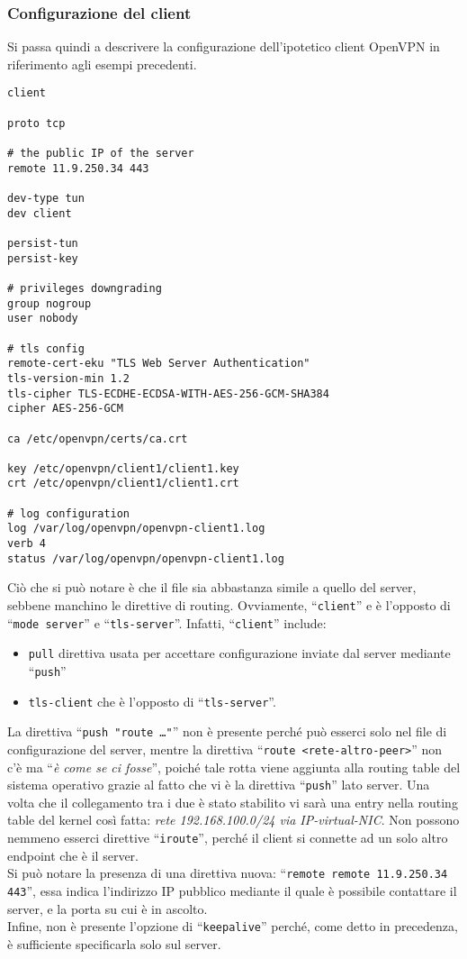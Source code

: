 \subsubsection{Configurazione del client}
Si passa quindi a descrivere la configurazione dell'ipotetico client OpenVPN in
riferimento agli esempi precedenti.
\begin{verbatim}
client

proto tcp

# the public IP of the server
remote 11.9.250.34 443

dev-type tun
dev client

persist-tun
persist-key

# privileges downgrading
group nogroup
user nobody

# tls config
remote-cert-eku "TLS Web Server Authentication"
tls-version-min 1.2
tls-cipher TLS-ECDHE-ECDSA-WITH-AES-256-GCM-SHA384
cipher AES-256-GCM

ca /etc/openvpn/certs/ca.crt

key /etc/openvpn/client1/client1.key
crt /etc/openvpn/client1/client1.crt

# log configuration
log /var/log/openvpn/openvpn-client1.log
verb 4
status /var/log/openvpn/openvpn-client1.log
\end{verbatim}
Ciò che si può notare è che il file sia abbastanza simile a quello del server,
sebbene manchino le direttive di routing. Ovviamente, ``\texttt{client}'' e
è l'opposto di ``\texttt{mode server}'' e
``\texttt{tls-server}''. Infatti, ``\texttt{client}'' include:
\begin{itemize}
  \item \texttt{pull} direttiva usata per accettare configurazione inviate dal
  server mediante ``\texttt{push}''
  \item \texttt{tls-client} che è l'opposto di ``\texttt{tls-server}''.
\end{itemize}
La direttiva ``\texttt{push "route \ldots"}''
non è presente perché può esserci solo nel file di configurazione del server,
mentre la direttiva ``\texttt{route <rete-altro-peer>}'' non c'è ma ``\textit{è come
se ci fosse}'', poiché tale rotta viene aggiunta alla routing table del sistema
operativo grazie al fatto che vi è la direttiva ``\texttt{push}'' lato server.
Una volta che il collegamento tra i due è stato stabilito vi sarà una entry
nella routing table del kernel così fatta: \textit{rete 192.168.100.0/24 via
IP-virtual-NIC}. Non possono nemmeno esserci direttive ``\texttt{iroute}'', perché
il client si connette ad un solo altro endpoint che è il server.\\
Si può notare la presenza di una direttiva nuova: ``\texttt{remote remote 11.9.250.34 443}'',
essa indica l'indirizzo IP pubblico mediante il quale è possibile contattare
il server, e la porta su cui è in ascolto.\\
Infine, non è presente l'opzione di ``\texttt{keepalive}'' perché, come detto in
precedenza, è sufficiente specificarla solo sul server.


